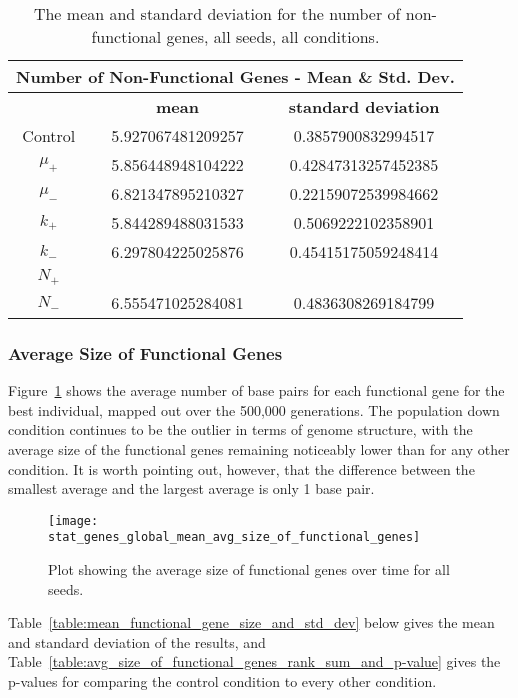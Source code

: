 \begin{table}[h]
	\centering
	\begin{tabular}{|c|c|c|}
		\hline
		\multicolumn{3}{c}{\Large \textbf{Number of Non-Functional Genes - Mean \& Std. Dev.}} \\
		\hline
		& \textbf{mean} & \textbf{standard deviation} \\
		\hline
		Control & 5.927067481209257 & 0.3857900832994517 \\
		\hline
		$\mu_+$ & 5.856448948104222	& 0.42847313257452385 \\
		\hline
		$\mu_-$ & 6.821347895210327 & 0.22159072539984662 \\
		\hline
		$k_+$ & 5.844289488031533 & 0.5069222102358901 \\
		\hline
		$k_-$ & 6.297804225025876 & 0.45415175059248414 \\
		\hline
		$N_+$ & & \\
		\hline
		$N_-$ & 6.555471025284081 & 0.4836308269184799 \\
		\hline
	\end{tabular}
	\caption[Number of Non-functional Genes - Mean \& St. Dev.]{The mean and standard deviation for the number of non-functional genes, all seeds, all conditions.}
	\label{table:non-functional_genes_mean_std_dev}
\end{table}

\subsubsection{Average Size of Functional Genes}\label{sec:average_size_functional_genes}
Figure~\ref{fig:mean_functional_gene_size} shows the average number of base pairs for each functional gene for the best individual, mapped out over the 500,000 generations. The population down condition continues to be the outlier in terms of genome structure, with the average size of the functional genes remaining noticeably lower than for any other condition. It is worth pointing out, however, that the difference between the smallest average and the largest average is only 1 base pair. 
\begin{figure}[H]
	\centering
	\texttt{[image: stat\_genes\_global\_mean\_avg\_size\_of\_functional\_genes]}
	\caption[Average size of functional genes]{Plot showing the average size of functional genes over time for all seeds.}
	\label{fig:mean_functional_gene_size}
\end{figure}
Table~\ref{table:mean_functional_gene_size_and_std_dev} below gives the mean and standard deviation of the results, and Table~\ref{table:avg_size_of_functional_genes_rank_sum_and_p-value} gives the p-values for comparing the control condition to every other condition. 

